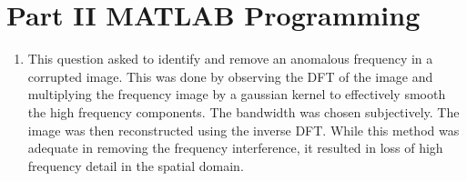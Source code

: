 \documentclass{article}[12 pt]
\begin{document}
\begin{enumerate}


\end{enumerate}

\section*{Part II MATLAB Programming}
\begin{enumerate}
\item This question asked to identify and remove an anomalous frequency in a corrupted image.  This was done by observing the DFT of the image and multiplying the frequency image by a gaussian kernel to effectively smooth the high frequency components.  The bandwidth was chosen subjectively.  The image was then reconstructed using the inverse DFT.  While this method was adequate in removing the frequency interference, it resulted in loss of high frequency detail in the spatial domain.


\end{enumerate}
\end{document}

